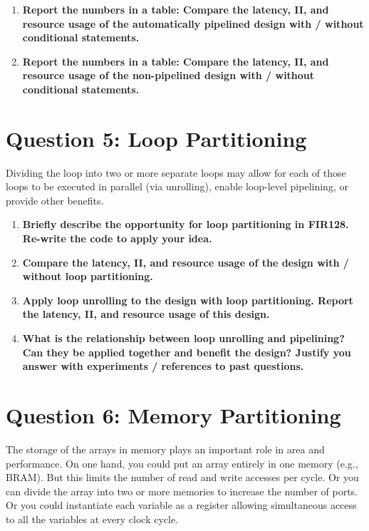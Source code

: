 \documentclass[12pt,a4paper]{article}
\begin{document}
\begin{enumerate}
    \item[(a)] \textbf{Report the numbers in a table: Compare the latency, II, and resource usage of the automatically pipelined design with / without conditional statements.}
    
    \item[(b)] \textbf{Report the numbers in a table: Compare the latency, II, and resource usage of the non-pipelined design with / without conditional statements.}
    
\end{enumerate}


\section*{Question 5: Loop Partitioning}

Dividing the loop into two or more separate loops may allow for each of those loops to be executed in parallel (via unrolling), enable loop-level pipelining, or provide other benefits.

\begin{enumerate}
    \item[(a)] \textbf{Briefly describe the opportunity for loop partitioning in FIR128. Re-write the code to apply your idea.}
    \item[(b)] \textbf{Compare the latency, II, and resource usage of the design with / without loop partitioning.}
    \item[(c)] \textbf{Apply loop unrolling to the design with loop partitioning. Report the latency, II, and resource usage of this design.}
    \item[(d)] \textbf{What is the relationship between loop unrolling and pipelining? Can they be applied together and benefit the design? Justify you answer with experiments / references to past questions.}
\end{enumerate}


\section*{Question 6: Memory Partitioning}

The storage of the arrays in memory plays an important role in area and performance.
On one hand, you could put an array entirely in one memory (e.g., BRAM).
But this limits the number of read and write accesses per cycle.
Or you can divide the array into two or more memories to increase the number of ports.
Or you could instantiate each variable as a register allowing simultaneous access to all the variables at every clock cycle.
\end{document}
